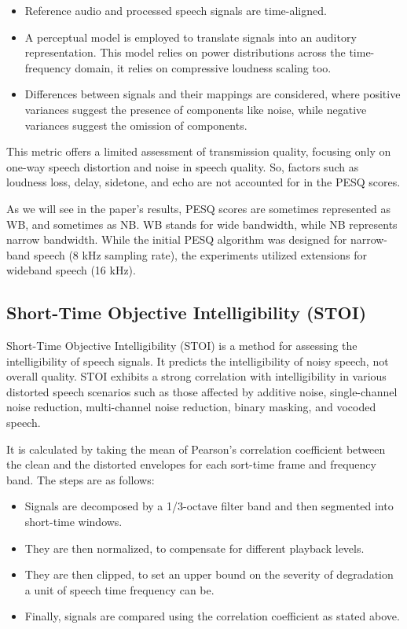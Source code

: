 \begin{itemize}
    \item Reference audio and processed speech signals are time-aligned.
    \item A perceptual model is employed to translate signals into an auditory representation. This model relies on power distributions across the time-frequency domain, it relies on compressive loudness scaling too.
    \item Differences between signals and their mappings are considered, where positive variances suggest the presence of components like noise, while negative variances suggest the omission of components.
\end{itemize}

This metric offers a limited assessment of transmission quality, focusing only on one-way speech distortion and noise in speech quality. So, factors such as loudness loss, delay, sidetone, and echo are not accounted for in the PESQ scores.

As we will see in the paper's results, PESQ scores are sometimes represented as WB, and sometimes as NB. WB stands for wide bandwidth, while NB represents narrow bandwidth. While the initial PESQ algorithm was designed for narrow-band speech (8 kHz sampling rate), the experiments utilized extensions for wideband speech (16 kHz).


\subsection{Short-Time Objective Intelligibility (STOI)}
Short-Time Objective Intelligibility (STOI) is a method for assessing the intelligibility of speech signals. It predicts the intelligibility of noisy speech, not overall quality. STOI exhibits a strong correlation with intelligibility in various distorted speech scenarios such as those affected by additive noise, single-channel noise reduction, multi-channel noise reduction, binary masking, and vocoded speech.

It is calculated by taking the mean of Pearson's correlation coefficient between the clean and the distorted envelopes for each sort-time frame and frequency band. The steps are as follows:

\begin{itemize}
    \item Signals are decomposed by a 1/3-octave filter band and then segmented into short-time windows.
    \item They are then normalized, to compensate for different playback levels.
    \item They are then clipped, to set an upper bound on the severity of degradation a unit of speech time frequency can be.
    \item Finally, signals are compared using the correlation coefficient as stated above.
\end{itemize}

